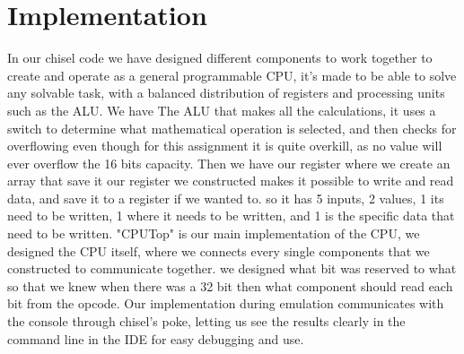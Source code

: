 \documentclass[a4paper, english]{article}
\numberwithin{equation}{section}
\begin{document}
\section{Implementation}\label{sec:implement}
In our chisel code we have designed different components to work together to create and operate as a general programmable CPU, it's made to be able to solve any solvable task, with a balanced distribution of registers and processing units such as the ALU.
We have The ALU that makes all the calculations, it uses a switch to determine what mathematical operation is selected, and then checks for overflowing even though for this assignment it is quite overkill, as no value will ever overflow the 16 bits capacity.
Then we have our register where we create an array that save it
our register we constructed makes it possible to write and read data, and save it to a register if we wanted to. so it has 5 inputs, 2 values, 1 its need to be written, 1 where it needs to be written, and 1 is the specific data that need to be written.
"CPUTop" is our main implementation of the CPU, we designed the CPU itself, where we connects every single components that we constructed to communicate together. we designed what bit was reserved to what so that we knew when there was a 32 bit then what component should read each bit from the opcode. Our implementation during emulation communicates with the console through chisel's poke, letting us see the results clearly in the command line in the IDE for easy debugging and use.
\end{document}
